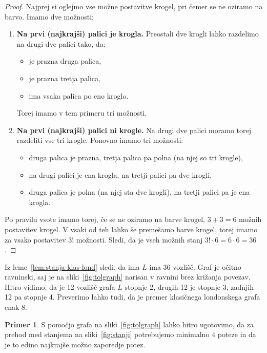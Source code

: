 \documentclass[12pt,a4paper]{amsart}
\theoremstyle{definition} %
\newtheorem{primer}[definicija]{Primer}
\theoremstyle{plain} %
\begin{document}
\begin{proof}
    Najprej si oglejmo vse možne postavitve krogel, pri čemer se ne oziramo na barvo.
    Imamo dve možnosti:
    \begin{enumerate}
        \item \textbf{Na prvi (najkrajši) palici je krogla.}
        Preostali dve krogli lahko razdelimo na drugi dve palici tako, da:
        \begin{itemize}[label={-}]
            \item je prazna druga palica,
            \item je prazna tretja palica,
            \item ima vsaka palica po eno kroglo.
        \end{itemize}
        Torej imamo v tem primeru tri možnosti.
        
        \item \textbf{Na prvi (najkrajši) palici ni krogle.}
        Na drugi dve palici moramo torej razdeliti vse tri krogle.
        Ponovno imamo tri možnosti:
        \begin{itemize}[label={-}]
            \item druga palica je prazna, tretja palica pa polna (na njej so tri krogle),
            \item na drugi palici je ena krogla, na tretji palici pa dve krogli,
            \item druga palica je polna (na njej sta dve krogli), na tretji palici pa je ena krogla.
        \end{itemize}
    \end{enumerate}
    Po pravilu vsote imamo torej, če se ne oziramo na barve krogel, $3+3=6$ možnih postavitev krogel.
    V vsaki od teh lahko še premešamo barve krogel, torej imamo za vsako postavitev $3!$ možnosti. Sledi, da je vseh možnih stanj $3! \cdot 6 = 6 \cdot 6 = 36$.\qedhere
\end{proof}

Iz leme~\ref{lem:stanja-klas-lond} sledi, da ima $L$ ima 36 vozlišč. Graf je očitno ravninski, saj je na sliki~\ref{fig:tolgraph} narisan v ravnini brez križanja povezav. Hitro vidimo, da je 12 vozlišč grafa $L$ stopnje 2, drugih 12 je stopnje 3, zadnjih 12 pa stopnje 4. Preverimo lahko tudi, da je premer klasičnega londonskega grafa enak 8.

\begin{primer}
    S pomočjo grafa na sliki~\ref{fig:tolgraph} lahko hitro ugotovimo, da za prehod med stanjema na sliki~\ref{fig:stanji} potrebujemo minimalno 4 poteze in da je to edino najkrajše možno zaporedje potez.
\end{primer}
\end{document}

